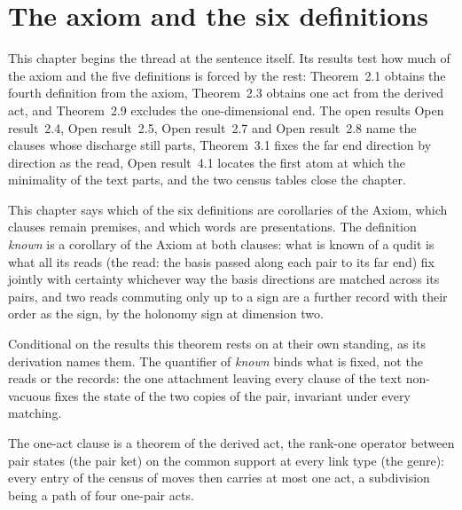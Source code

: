 \section{The axiom and the six definitions}\label{mod:I-1-axiom-and-the-six-definitions}
\label{narr:open:1-1}This chapter begins the thread at the sentence itself. Its results test how much of the axiom and the five definitions is forced by the rest: Theorem~2.1 obtains the fourth definition from the axiom, Theorem~2.3 obtains one act from the derived act, and Theorem~2.9 excludes the one-dimensional end. The open results Open result~2.4, Open result~2.5, Open result~2.7 and Open result~2.8 name the clauses whose discharge still parts, Theorem~3.1 fixes the far end direction by direction as the read, Open result~4.1 locates the first atom at which the minimality of the text parts, and the two census tables close the chapter.
\begin{chtheorem}\label{box:I-1-axiom-and-the-six-definitions:1}
This chapter says which of the six definitions are corollaries of the Axiom, which clauses remain premises, and which words are presentations. The definition \emph{known} is a corollary of the Axiom at both clauses: what is known of a qudit is what all its reads (the read: the basis passed along each pair to its far end) fix jointly with certainty whichever way the basis directions are matched across its pairs, and two reads commuting only up to a sign are a further record with their order as the sign, by the holonomy sign at dimension two.
\end{chtheorem}
\begin{chconditional}\label{box:I-1-axiom-and-the-six-definitions:2}
Conditional on the results this theorem rests on at their own standing, as its derivation names them.
The quantifier of \emph{known} binds what is fixed, not the reads or the records: the one attachment leaving every clause of the text non-vacuous fixes the state of the two copies of the pair, invariant under every matching.
\end{chconditional}
\begin{chtheorem}\label{box:I-1-axiom-and-the-six-definitions:3}
The one-act clause is a theorem of the derived act, the rank-one operator between pair states (the pair ket) on the common support at every link type (the genre): every entry of the census of moves then carries at most one act, a subdivision being a path of four one-pair acts.
\end{chtheorem}

